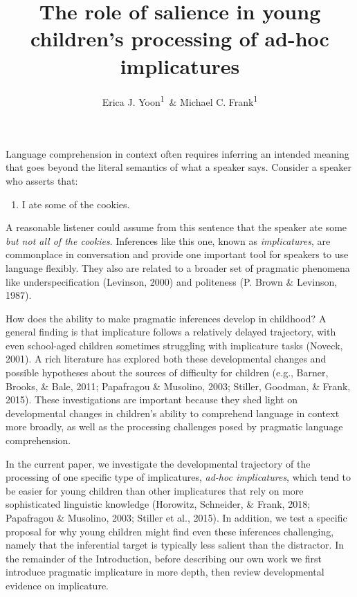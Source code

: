 \documentclass[man]{apa6}
\title{The role of salience in young children's processing of ad-hoc
implicatures}
\author{Erica J. Yoon\textsuperscript{1}~\& Michael C. Frank\textsuperscript{1}}
\affiliation{
    \vspace{0.5cm}
          \textsuperscript{1} Stanford University  }
\providecommand{\tightlist}{%
  \setlength{\itemsep}{0pt}\setlength{\parskip}{0pt}}
\begin{document}
\maketitle

\setcounter{secnumdepth}{0}



Language comprehension in context often requires inferring an intended
meaning that goes beyond the literal semantics of what a speaker says.
Consider a speaker who asserts that:

\begin{enumerate}
\def\labelenumi{(\arabic{enumi})}
\tightlist
\item
  I ate some of the cookies.
\end{enumerate}

\noindent A reasonable listener could assume from this sentence that the
speaker ate some \emph{but not all of the cookies}. Inferences like this
one, known as \emph{implicatures}, are commonplace in conversation and
provide one important tool for speakers to use language flexibly. They
also are related to a broader set of pragmatic phenomena like
underspecification (Levinson, 2000) and politeness (P. Brown \&
Levinson, 1987).

How does the ability to make pragmatic inferences develop in childhood?
A general finding is that implicature follows a relatively delayed
trajectory, with even school-aged children sometimes struggling with
implicature tasks (Noveck, 2001). A rich literature has explored both
these developmental changes and possible hypotheses about the sources of
difficulty for children (e.g., Barner, Brooks, \& Bale, 2011; Papafragou
\& Musolino, 2003; Stiller, Goodman, \& Frank, 2015). These
investigations are important because they shed light on developmental
changes in children's ability to comprehend language in context more
broadly, as well as the processing challenges posed by pragmatic
language comprehension.

In the current paper, we investigate the developmental trajectory of the
processing of one specific type of implicatures, \emph{ad-hoc
implicatures}, which tend to be easier for young children than other
implicatures that rely on more sophisticated linguistic knowledge
(Horowitz, Schneider, \& Frank, 2018; Papafragou \& Musolino, 2003;
Stiller et al., 2015). In addition, we test a specific proposal for why
young children might find even these inferences challenging, namely that
the inferential target is typically less salient than the distractor. In
the remainder of the Introduction, before describing our own work we
first introduce pragmatic implicature in more depth, then review
developmental evidence on implicature.
\end{document}
